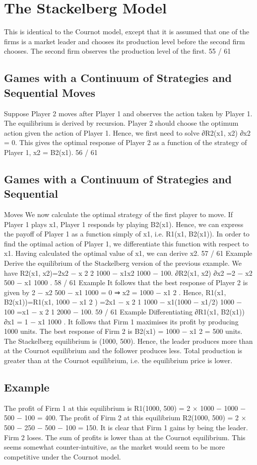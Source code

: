 \documentclass[]{report}
\begin{document}
\section{The Stackelberg Model}
This is identical to the Cournot model, except that it is assumed
that one of the firms is a market leader and chooses its production
level before the second firm chooses.
The second firm observes the production level of the first.
55 / 61
\subsection{Games with a Continuum of Strategies and Sequential Moves}
Suppose Player 2 moves after Player 1 and observes the action
taken by Player 1. The equilibrium is derived by recursion.
Player 2 should choose the optimum action given the action of
Player 1.
Hence, we first need to solve
∂R2(x1, x2)
∂x2
= 0.
This gives the optimal response of Player 2 as a function of the
strategy of Player 1, x2 = B2(x1).
56 / 61
\subsection{Games with a Continuum of Strategies and Sequential}
Moves
We now calculate the optimal strategy of the first player to move.
If Player 1 plays x1, Player 1 responds by playing B2(x1). Hence,
we can express the payoff of Player 1 as a function simply of x1,
i.e. R1(x1, B2(x1)).
In order to find the optimal action of Player 1, we differentiate this
function with respect to x1.
Having calculated the optimal value of x1, we can derive x2.
57 / 61
Example
Derive the equilibrium of the Stackelberg version of the previous
example.
We have
R2(x1, x2)=2x2 −
x
2
2
1000
−
x1x2
1000
− 100.
∂R2(x1, x2)
∂x2
=2 −
x2
500
−
x1
1000
.
58 / 61
Example
It follows that the best response of Player 2 is given by
2 −
x2
500
−
x1
1000
= 0 ⇒ x2 = 1000 −
x1
2
.
Hence,
R1(x1, B2(x1))=R1(x1, 1000 −
x1
2
)
=2x1 −
x
2
1
1000
−
x1(1000 − x1/2)
1000
− 100
=x1 −
x
2
1
2000
− 100.
59 / 61
Example
Differentiating
∂R1(x1, B2(x1))
∂x1
= 1 −
x1
1000
.
It follows that Firm 1 maximises its profit by producing 1000 units.
The best response of Firm 2 is B2(x1) = 1000 −
x1
2 = 500 units.
The Stackelberg equilibrium is (1000, 500). Hence, the leader
produces more than at the Cournot equilibrium and the follower
produces less.
Total production is greater than at the Cournot equilibrium, i.e.
the equilibrium price is lower.
\subsection{Example}
The profit of Firm 1 at this equilibrium is
R1(1000, 500) = 2 × 1000 − 1000 − 500 − 100 = 400.
The profit of Firm 2 at this equilibrium
R2(1000, 500) = 2 × 500 − 250 − 500 − 100 = 150.
It is clear that Firm 1 gains by being the leader. Firm 2 loses. The
sum of profits is lower than at the Cournot equilibrium.
This seems somewhat counter-intuitive, as the market would seem
to be more competitive under the Cournot model.
\end{document}
